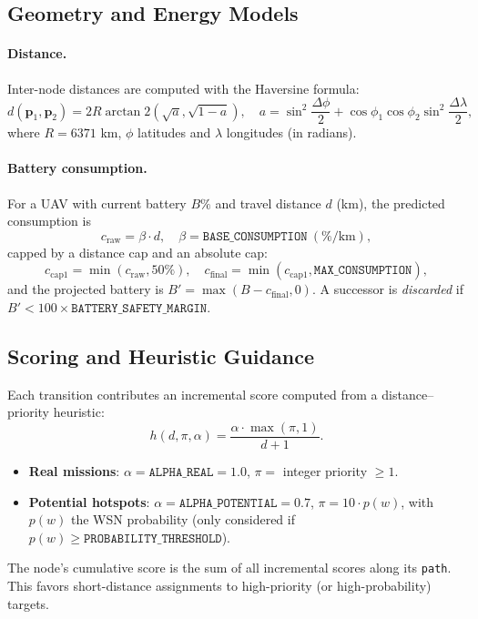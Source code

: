 \subsection*{Geometry and Energy Models}
\paragraph{Distance.}
Inter-node distances are computed with the Haversine formula:
\[
d(\mathbf{p}_1,\mathbf{p}_2) = 2R\arctan2\left(\sqrt{a},\sqrt{1-a}\right),\quad
a = \sin^2\frac{\Delta\phi}{2} + \cos\phi_1\cos\phi_2\sin^2\frac{\Delta\lambda}{2},
\]
where \(R=6371\) km, \(\phi\) latitudes and \(\lambda\) longitudes (in radians).

\paragraph{Battery consumption.}
For a UAV with current battery \(B\%\) and travel distance \(d\) (km), the predicted consumption is
\[
c_{\text{raw}} = \beta \cdot d, \quad \beta=\texttt{BASE\_CONSUMPTION}~(\%/\text{km}),
\]
capped by a distance cap and an absolute cap:
\[
c_{\text{cap1}}=\min(c_{\text{raw}}, 50\%),\quad
c_{\text{final}}=\min(c_{\text{cap1}}, \texttt{MAX\_CONSUMPTION}),
\]
and the projected battery is \(B'=\max(B - c_{\text{final}}, 0)\).
A successor is \emph{discarded} if \(B' < 100\times \texttt{BATTERY\_SAFETY\_MARGIN}\).

\subsection*{Scoring and Heuristic Guidance}
Each transition contributes an incremental score computed from a distance--priority heuristic:
\[
h(d, \pi, \alpha) = \frac{\alpha \cdot \max(\pi, 1)}{d + 1}.
\]
\begin{itemize}
  \item \textbf{Real missions}: \(\alpha=\texttt{ALPHA\_REAL}=1.0\), \(\pi=\) integer priority \(\ge 1\).
  \item \textbf{Potential hotspots}: \(\alpha=\texttt{ALPHA\_POTENTIAL}=0.7\),
        \(\pi = 10\cdot p(w)\), with \(p(w)\) the WSN probability (only considered if
        \(p(w)\ge \texttt{PROBABILITY\_THRESHOLD}\)).
\end{itemize}
The node's cumulative score is the sum of all incremental scores along its \texttt{path}.
This favors short-distance assignments to high-priority (or high-probability) targets.


